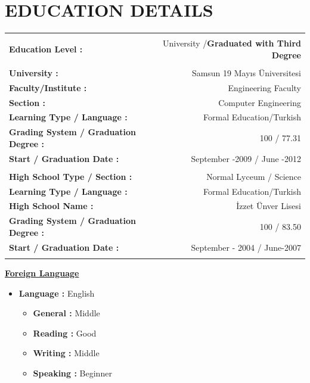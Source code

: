 \documentclass[10pt,a4paper]{article}
\begin{document}
\section{\sc E{\footnotesize DUCATION} D{\footnotesize ETAILS}}
\hspace*{1in}\begin{tabular}{lr}
\vspace{0.5 mm}\\
\textbf{Education Level :} & University /\textbf{Graduated with Third Degree} \\
\vspace{0.5 mm}\\
\textbf{University :} & Samsun 19 Mayıs Üniversitesi \\
\textbf{Faculty/Institute :} & Engineering Faculty \\
\textbf{Section :} & Computer Engineering \\
\textbf{Learning Type / Language :} & Formal Education/Turkish \\
\textbf{Grading System / Graduation Degree :} & 100 / 77.31 \\
\textbf{Start / Graduation Date :} & September -2009 / June -2012\\
\vspace{0.5 mm}\\
\textbf{High School Type / Section :} & Normal Lyceum / Science\\
\textbf{Learning Type / Language :} & Formal Education/Turkish\\
\textbf{High School Name :} & İzzet Ünver Lisesi\\
\textbf{Grading System / Graduation Degree :} & 100 / 83.50\\
\textbf{Start / Graduation Date :} & September - 2004 / June-2007\\
\vspace{0.5 mm}\\
\end{tabular}

\underline{\textbf{Foreign Language}}
\vspace{0.5 mm}\\
\begin{itemize}
  \item{\textbf{Language :} English}
  \begin{itemize}
    \item{\textbf{General :} Middle}
    \item{\textbf{Reading :} Good}
    \item{\textbf{Writing :} Middle}
    \item{\textbf{Speaking :} Beginner}
  \end{itemize}
\end{itemize}
\end{document}
